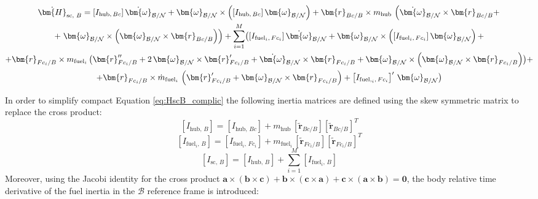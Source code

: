 \begin{multline}\label{eq:HscB_complic}
	\dot{\bm{H}}_{\text{sc, }B} = \left[I_{\text{hub},\,Bc}\right]\dot{\bm{\omega}}_{\cal{B}/\cal{N}} + \bm{\omega}_{\cal{B}/\cal{N}} \times \left(\left[I_{\text{hub},\,Bc}\right]\bm{\omega}_{\cal{B}/\cal{N}}\right)
	+ \bm{r}_{Bc/B} \times m_\text{hub}\,\left(\dot{\bm{\omega}}_{\cal{B}/\cal{N}} \times \bm{r}_{Bc/B} +\right.\\
	+\left. \bm{\omega}_{\cal{B}/\cal{N}} \times \left(\bm{\omega}_{\cal{B}/\cal{N}} \times \bm{r}_{Bc/B}\right) \right)
	+\sum_{i=1}^{M} \bigl(\left[I_{\text{fuel}_i,\,Fc_i}\right] \dot{\bm{\omega}}_{\cal{B}/\cal{N}} + \bm{\omega}_{\cal{B}/\cal{N}} \times \left(\left[I_{\text{fuel}_i,\,Fc_i}\right] \bm{\omega}_{\cal{B}/\cal{N}}\right) +\\
	+ \bm{r}_{Fc_i/B} \times m_{\text{fuel}_i}\, \bigl( \bm{r}''_{Fc_i/B} + 2\,\bm{\omega}_{\mathcal{B}/\mathcal{N}} \times \bm{r}'_{Fc_i/B}
	+ \dot{\bm{\omega}}_{\cal{B}/\cal{N}} \times \bm{r}_{Fc_i/B} + \bm{\omega}_{\cal{B}/\cal{N}} \times
	\left(\bm{\omega}_{\cal{B}/\cal{N}} \times \bm{r}_{Fc_i/B}\right) \bigr)+\\
	+
	\bm{r}_{Fc_i/B} \times \dot{m}_{\text{fuel}_i} \,\left(\bm{r}'_{Fc_i/B}+\bm{\omega}_{\cal{B}/\cal{N}} \times \bm{r}_{Fc_i/B}\right)
	+ \left[I_{\text{fuel,}_i,\,Fc_i}\right]' \, \bm{\omega}_{\cal{B}/\cal{N}}\bigr)
\end{multline}

In order to simplify compact Equation \eqref{eq:HscB_complic} the following inertia matrices are defined using the skew symmetric matrix to replace the cross product:
\begin{equation}\label{eq:eq44}
	\left[I_{\text{hub},\,B}\right]= \left[I_{\text{hub},\,Bc}\right] + m_\text{hub}\, \left[\tilde{\bm{r}}_{Bc/B}\right]\left[\tilde{\bm{r}}_{Bc/B}\right]^T
\end{equation}
\begin{equation}\label{eq:eq45}
	\left[I_{\text{fuel}_i,\,B}\right]= \left[I_{\text{fuel}_i,\,Fc_i}\right] + m_{\text{fuel}_i}\, \left[\tilde{\bm{r}}_{Fc_i/B}\right]\left[\tilde{\bm{r}}_{Fc_i/B}\right]^T
\end{equation}
\begin{equation}\label{eq:eq46}
	\left[I_{\text{sc, }B}\right]=  \left[I_{\text{hub},\,B}\right] + \sum_{i=1}^{M}\left[I_{\text{fuel}_i,\,B}\right]
\end{equation}
Moreover, using the Jacobi identity for the cross product $
\mathbf {a} \times (\mathbf {b} \times \mathbf {c} )+\mathbf {b} \times (\mathbf {c} \times \mathbf {a} )+\mathbf {c} \times (\mathbf {a} \times \mathbf {b} )=\mathbf {0}$, the body relative time derivative of the fuel inertia in the $\mathcal{B}$ reference frame is introduced:

